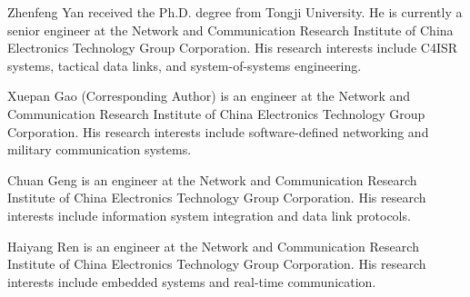 \documentclass{ieeeaccess}
\begin{document}
\begin{IEEEbiography}{Zhenfeng Yan}
received the Ph.D. degree from Tongji University. He is currently a senior engineer at the Network and Communication Research Institute of China Electronics Technology Group Corporation. His research interests include C4ISR systems, tactical data links, and system-of-systems engineering.
\end{IEEEbiography}

\begin{IEEEbiography}{Xuepan Gao}
(Corresponding Author) is an engineer at the Network and Communication Research Institute of China Electronics Technology Group Corporation. His research interests include software-defined networking and military communication systems.
\end{IEEEbiography}

\begin{IEEEbiography}{Chuan Geng}
is an engineer at the Network and Communication Research Institute of China Electronics Technology Group Corporation. His research interests include information system integration and data link protocols.
\end{IEEEbiography}

\begin{IEEEbiography}{Haiyang Ren}
is an engineer at the Network and Communication Research Institute of China Electronics Technology Group Corporation. His research interests include embedded systems and real-time communication.
\end{IEEEbiography}

\EOD
\end{document}
